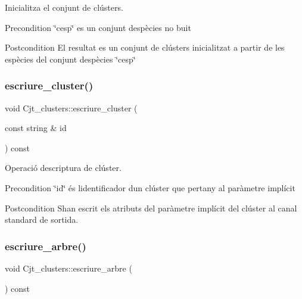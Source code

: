 Inicialitza el conjunt de clústers. 

\begin{DoxyPrecond}{Precondition}
\char`\"{}cesp\char`\"{} es un conjunt d\textquotesingle{}espècies no buit 
\end{DoxyPrecond}
\begin{DoxyPostcond}{Postcondition}
El resultat es un conjunt de clústers inicialitzat a partir de les espècies del conjunt d\textquotesingle{}espècies \char`\"{}cesp\char`\"{} 
\end{DoxyPostcond}
\mbox{\label{class_cjt__clusters_ad023ea2a94f2629848f5c6b7162ac8d8}} 
\subsubsection{\texorpdfstring{escriure\+\_\+cluster()}{escriure\_cluster()}}
{\footnotesize\ttfamily void Cjt\+\_\+clusters\+::escriure\+\_\+cluster (\begin{DoxyParamCaption}\item[{const string \&}]{id }\end{DoxyParamCaption}) const}



Operació d\textquotesingle{}escriptura de clúster. 

\begin{DoxyPrecond}{Precondition}
\char`\"{}id\char`\"{} és l\textquotesingle{}identificador d\textquotesingle{}un clúster que pertany al paràmetre implícit 
\end{DoxyPrecond}
\begin{DoxyPostcond}{Postcondition}
S\textquotesingle{}han escrit els atributs del paràmetre implícit del clúster al canal standard de sortida. 
\end{DoxyPostcond}
\mbox{\label{class_cjt__clusters_afdef4a4f7bd8ca2ecaf723c65cc10be0}} 
\subsubsection{\texorpdfstring{escriure\+\_\+arbre()}{escriure\_arbre()}}
{\footnotesize\ttfamily void Cjt\+\_\+clusters\+::escriure\+\_\+arbre (\begin{DoxyParamCaption}{ }\end{DoxyParamCaption}) const}



